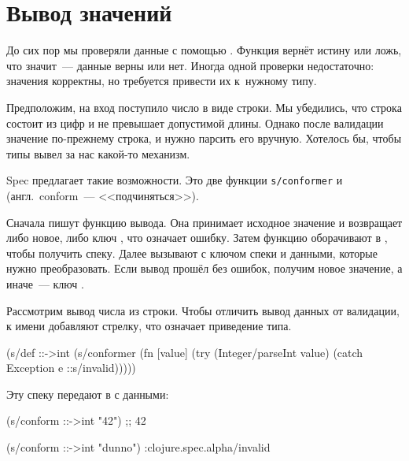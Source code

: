 \fi

\section{Вывод значений}

\label{spec-conform}


До сих пор мы проверяли данные с помощью . Функция вернёт истину
или ложь, что значит~--- данные верны или нет. Иногда одной проверки
недостаточно: значения корректны, но требуется привести их к~нужному типу.

Предположим, на вход поступило число в виде строки. Мы убедились, что строка
состоит из цифр и не превышает допустимой длины. Однако после валидации значение
по-прежнему строка, и нужно парсить его вручную. Хотелось бы, чтобы типы вывел
за нас какой-то механизм.


Spec предлагает такие возможности. Это две функции \texttt{s/con\-for\-mer}
и~ (англ.~con\-form~--- <<подчиняться>>).

\label{spec-invalid}



Сначала пишут функцию вывода. Она принимает исходное значение и возвращает либо
новое, либо ключ , что означает ошибку. Затем функцию
оборачивают в , чтобы получить спеку. Далее вызывают
 с ключом спеки и данными, которые нужно преобразовать. Если
вывод прошёл без ошибок, получим новое значение, а иначе~--- ключ
.

Рассмотрим вывод числа из строки. Чтобы отличить вывод данных от валидации, к
имени добавляют стрелку, что означает приведение типа.

\begin{clojure}
(s/def ::->int
  (s/conformer
   (fn [value]
     (try
       (Integer/parseInt value)
       (catch Exception e
         ::s/invalid)))))
\end{clojure}

\noindent
Эту спеку передают в  с данными:

\begin{clojure}
(s/conform ::->int "42") ;; 42

(s/conform ::->int "dunno")
:clojure.spec.alpha/invalid
\end{clojure}

